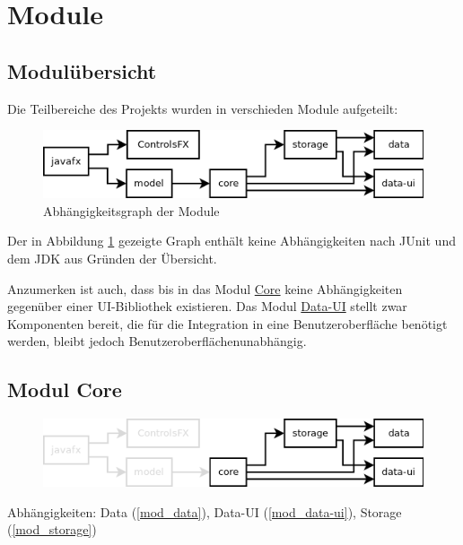 
\newcommand{\depBox}[1]{
	\begin{adjustbox}{minipage=0.85\textwidth,margin=0 \smallskipamount,center}
		Abhängigkeiten:	 \quad #1
	\end{adjustbox} ~\\
}
\newcommand{\refModCore}{\hyperref[mod_core]{Core}}
\newcommand{\refModData}{\hyperref[mod_data]{Data}}
\newcommand{\refModDataUI}{\hyperref[mod_data-ui]{Data-UI}}
\newcommand{\refModJavaFX}{\hyperref[mod_javafx]{JavaFX}}
\newcommand{\refModModel}{\hyperref[mod_model]{Model}}
\newcommand{\refModStorage}{\hyperref[mod_storage]{Storage}}

\section{Module}
\subsection{Modulübersicht}
Die Teilbereiche des Projekts wurden in verschieden Module aufgeteilt:
\begin{figure}[hb!]
	\centering
	\includegraphics[width=.8\textwidth]{module_dependencies.png}
	\caption{Abhängigkeitsgraph der Module}
	\label{mod_dep_view}
\end{figure}

Der in Abbildung \ref{mod_dep_view} gezeigte Graph enthält keine Abhängigkeiten nach JUnit und
dem JDK aus Gründen der Übersicht.

Anzumerken ist auch, dass bis in das Modul \refModCore{} keine Abhängigkeiten
gegenüber einer UI-Bibliothek existieren. Das Modul \hyperref[mod_data-ui]{Data-UI} stellt
zwar Komponenten bereit, die für die Integration in eine Benutzeroberfläche benötigt werden,
bleibt jedoch Benutzeroberflächenunabhängig.


\subsection{Modul Core}
\label{mod_core}
\begin{figure}[hb!]
	\centering
	\includegraphics[width=.8\textwidth]{module_dependencies_core.png}
\end{figure}
\depBox{Data (\ref{mod_data}), Data-UI (\ref{mod_data-ui}), Storage (\ref{mod_storage})}

